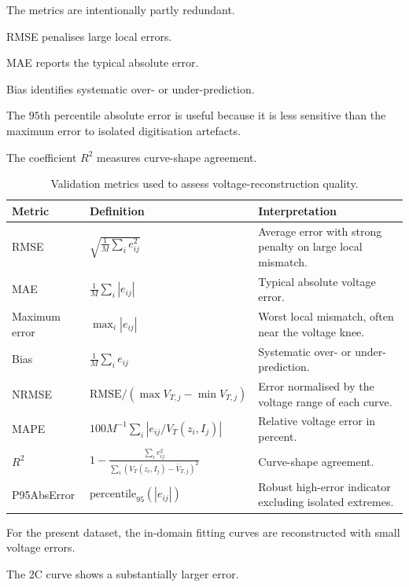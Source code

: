 \documentclass[a4paper,12pt]{article}
\begin{document}
The metrics are intentionally partly redundant.

RMSE penalises large local errors.

MAE reports the typical absolute error.

Bias identifies systematic over- or under-prediction.

The \(95\)th percentile absolute error is useful because it is less sensitive than the maximum error to isolated digitisation artefacts.

The coefficient \(R^2\) measures curve-shape agreement.

\begin{table}[H]
\centering
\caption{Validation metrics used to assess voltage-reconstruction quality.}
\label{tab:exec_metric_definitions}
\begin{tabularx}{0.98\textwidth}{@{}L{0.20\textwidth}L{0.36\textwidth}Y@{}}
\toprule
\textbf{Metric} &
\textbf{Definition} &
\textbf{Interpretation} \\
\midrule
RMSE &
\(\displaystyle \sqrt{\frac{1}{M}\sum_i e_{ij}^2}\) &
Average error with strong penalty on large local mismatch. \\
MAE &
\(\displaystyle \frac{1}{M}\sum_i |e_{ij}|\) &
Typical absolute voltage error. \\
Maximum error &
\(\displaystyle \max_i |e_{ij}|\) &
Worst local mismatch, often near the voltage knee. \\
Bias &
\(\displaystyle \frac{1}{M}\sum_i e_{ij}\) &
Systematic over- or under-prediction. \\
NRMSE &
\(\displaystyle \mathrm{RMSE}/(\max V_{T,j}-\min V_{T,j})\) &
Error normalised by the voltage range of each curve. \\
MAPE &
\(\displaystyle 100M^{-1}\sum_i |e_{ij}/V_T(z_i,I_j)|\) &
Relative voltage error in percent. \\
\(R^2\) &
\(\displaystyle 1-\frac{\sum_i e_{ij}^2}{\sum_i(V_T(z_i,I_j)-\bar{V}_{T,j})^2}\) &
Curve-shape agreement. \\
P95AbsError &
\(\displaystyle \mathrm{percentile}_{95}(|e_{ij}|)\) &
Robust high-error indicator excluding isolated extremes. \\
\bottomrule
\end{tabularx}
\end{table}

For the present dataset, the in-domain fitting curves are reconstructed with small voltage errors.

The 2C curve shows a substantially larger error.
\end{document}
